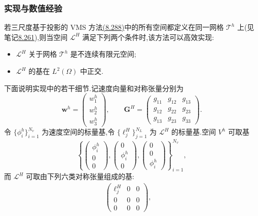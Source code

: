 \subsubsection{实现与数值经验}
\label{subsubsec:vms-coarse-projection-implementation}

\begin{note}[方法(8.288)的实现]
\label{note:vms-coarse-projection-implementation}
若三尺度基于投影的 VMS 方法\hyperref[eq:vms-coarse-projection-three-scale-method]{(8.288)}中的所有空间都定义在同一网格 $\mathcal T^h$ 上(见笔记\hyperref[note:vms-coarse-projection-spaces]{8.261}),则当空间 $\mathcal L^H$ 满足下列两个条件时,该方法可以高效实现:
\begin{itemize}
 \item $\mathcal L^H$ 关于网格 $\mathcal T^h$ 是不连续有限元空间;
 \item $\mathcal L^H$ 的基在 $L^2(\Omega)$ 中正交.
\end{itemize}
下面说明实现中的若干细节.记速度向量和对称张量分别为
\[
 \bm w^h=\begin{pmatrix}w_1^h\\w_2^h\\w_3^h\end{pmatrix},
 \qquad
 \bm G^H=\begin{pmatrix}
 g_{11}&g_{12}&g_{13}\\
 g_{12}&g_{22}&g_{23}\\
 g_{13}&g_{23}&g_{33}
 \end{pmatrix}.
\]
令 $\{\phi_i^h\}_{i=1}^{N_v}$ 为速度空间的标量基,令 $\{\ell_j^H\}_{j=1}^{N_L}$ 为 $\mathcal L^H$ 的标量基.空间 $V^h$ 可取基
\[
 \left\{
 \begin{pmatrix}\phi_i^h\\0\\0\end{pmatrix},
 \begin{pmatrix}0\\\phi_i^h\\0\end{pmatrix},
 \begin{pmatrix}0\\0\\\phi_i^h\end{pmatrix}
 \right\}_{i=1}^{N_v},
\]
而 $\mathcal L^H$ 可取由下列六类对称张量组成的基:
\[
\begin{gathered}
 \begin{pmatrix}\ell_j^H&0&0\\0&0&0\\0&0&0\end{pmatrix},\quad

\end{gathered}\]
\end{note}
